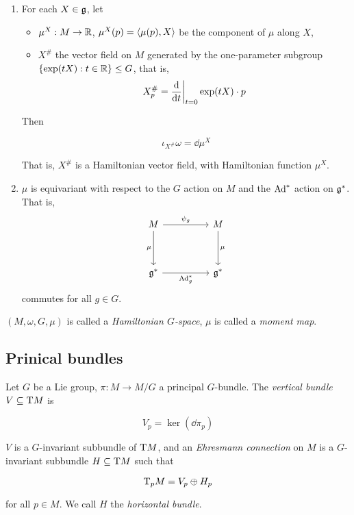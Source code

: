 \documentclass{article}
\begin{document}
\begin{enumerate}
    \item For each \(X \in \mathfrak{g}\), let
    \begin{itemize}
        \item \(\mu^X : M \to \mathbb{R}\), \(\mu^X(p) = \left\langle \mu(p), X \right\rangle\) be the component of \(\mu\) along \(X\),
        \item \(X^\#\) the vector field on \(M\) generated by the one-parameter subgroup \(\{\exp(tX) : t \in \mathbb{R}\} \le G\), that is,
        \[X^\#_p = \dv{t}\bigg\vert_{t=0} \exp(tX)\cdot p\]
    \end{itemize}
    Then 

    \[\iota_{X^\#}\omega = \dd \mu^X\]

    That is, \(X^\#\) is a Hamiltonian vector field, with Hamiltonian function \(\mu^X\).
    \item \(\mu\) is equivariant with respect to the \(G\) action on \(M\) and the \(\operatorname{Ad}^*\) action on \(\mathfrak{g}^*\). That is,
\[\begin{tikzcd}
	M && M \\
	\\
	{\mfg^*} && {\mfg^*}
	\arrow["\mu"', from=1-1, to=3-1]
	\arrow["\mu", from=1-3, to=3-3]
	\arrow["{\psi_g}", from=1-1, to=1-3]
	\arrow["{\Ad_g^*}"', from=3-1, to=3-3]
\end{tikzcd}\]
commutes for all \(g \in G\).
\end{enumerate}

\begin{definition}
     \((M, \omega, G, \mu)\) is called a \emph{Hamiltonian \(G\)-space}, \(\mu\) is called a \emph{moment map}.
\end{definition}

\subsection{Prinical bundles}

\begin{definition}
     Let \(G\) be a Lie group, \(\pi : M \to M/G\) a principal \(G\)-bundle. The \emph{vertical bundle} \(V \subseteq \mathrm{T} M\) is

    \[V_p = \ker(\dd\pi_p)\]

    \(V\) is a \(G\)-invariant subbundle of \(\mathrm{T} M\), and an \emph{Ehresmann connection} on \(M\) is a \(G\)-invariant subbundle \(H \subseteq \mathrm{T} M\) such that

    \[\mathrm{T}_p M = V_p \oplus H_p\]

    for all \(p \in M\). We call \(H\) the \emph{horizontal bundle}.
\end{definition}
\end{document}
